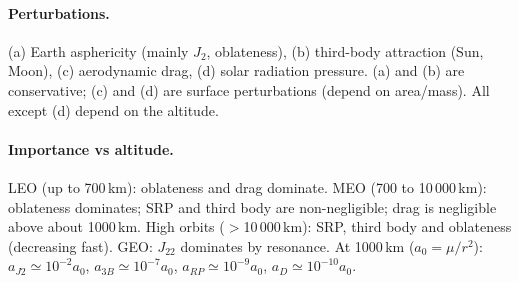 \paragraph{Perturbations.} (a) Earth asphericity (mainly $J_2$, oblateness), (b) third-body attraction (Sun, Moon), (c) aerodynamic drag, (d) solar radiation
pressure. (a) and (b) are conservative; (c) and (d) are surface perturbations (depend on area/mass). All except (d) depend on the altitude.
\paragraph{Importance vs altitude.} LEO (up to 700\,km): oblateness and drag dominate. MEO (700 to 10\,000\,km): oblateness dominates; SRP and
third body are non-negligible; drag is negligible above about 1000\,km. High orbits ($>$10\,000\,km): SRP, third body and oblateness (decreasing fast). GEO:
$J_{22}$ dominates by resonance. At 1000\,km ($a_0=\mu/r^2$):
$a_{J2}\simeq10^{-2}a_0$, $a_{3B}\simeq10^{-7}a_0$, $a_{RP}\simeq10^{-9}a_0$, $a_D\simeq10^{-10}a_0$.
